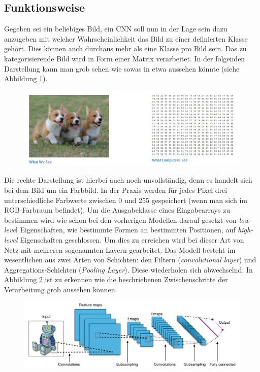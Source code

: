 \subsection{Funktionsweise}
Gegeben sei ein beliebiges Bild, ein CNN soll nun in der Lage sein dazu anzugeben mit welcher Wahrscheinlichkeit das Bild zu einer definierten Klasse gehört. Dies können auch durchaus mehr als eine Klasse pro Bild sein. Das zu kategorisierende Bild wird in Form einer Matrix verarbeitet. In der folgenden Darstellung kann man grob sehen wie sowas in etwa aussehen könnte (siehe Abbildung \ref{fig:puppies}). 

\begin{figure}[!htb]
	\centering
	\includegraphics[width=.9\linewidth]{img/humanVsPc}
	\label{fig:puppies}
\end{figure}

Die rechte Darstellung ist hierbei auch noch unvollständig, denn es handelt sich bei dem Bild um ein Farbbild. In der Praxis werden für jedes Pixel drei unterschiedliche Farbwerte zwischen 0 und 255 gespeichert (wenn man sich im RGB-Farbraum befindet). Um die Ausgabeklasse eines Eingabearrays zu bestimmen wird wie schon bei den vorherigen Modellen darauf gesetzt von \emph{low-leve}l Eigenschaften, wie bestimmte Formen an bestimmten Positionen, auf \emph{high-level} Eigenschaften geschlossen. Um dies zu erreichen wird bei dieser Art von Netz mit mehreren sogenannten Layern gearbeitet. Das Modell besteht im wesentlichen aus zwei Arten von Schichten: den Filtern (\emph{convolutional layer}) und Aggregations-Schichten (\emph{Pooling Layer}). Diese wiederholen sich abwechselnd. In Abbildung \ref{fig:cnnOverview} ist zu erkennen wie die beschriebenen Zwischenschritte der Verarbeitung grob aussehen können. 

\begin{figure}[!htb]
	\centering
	\includegraphics[width=.9\linewidth]{img/cnn_overview}
	\label{fig:cnnOverview}
\end{figure}

